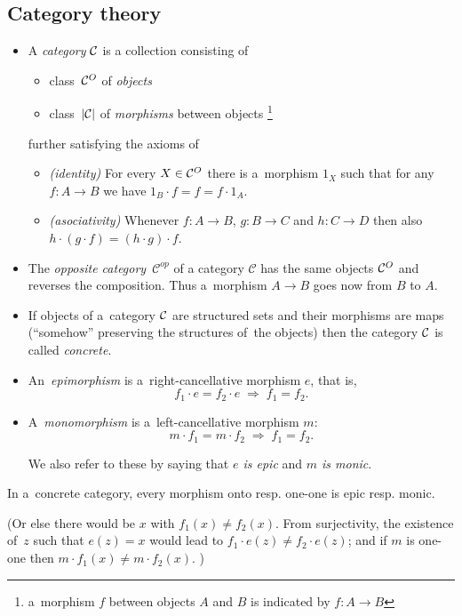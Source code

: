 \subsection*{Category theory}

\begin{itemize}
\item A \emph{category} $\mathcal{C}$ is a collection consisting of
  \begin{itemize}
  \item class~$\mathcal{C}^O$ of \emph{objects\/}
  \item class~$|\mathcal{C}|$ of \emph{morphisms\/} between objects\thinspace%
  \footnote{a~morphism $f$ between objects $A$ and $B$ is indicated by $f\colon
    A \to B$}
  \end{itemize}
further satisfying the axioms of
  \begin{itemize}
  \item \emph{(identity)\/}
  For every $X\in \mathcal{C}^O$ there is a~morphism $1_X$ such that for any $f\colon
  A \to B$ we have $1_B \cdot f = f = f \cdot 1_A$.
  \item \emph{(asociativity)\/}
  Whenever $f\colon A \to B$, $g\colon B \to C$ and $h\colon C \to D$ then also $h
  \cdot (g \cdot f) = (h \cdot g) \cdot f$.
  \end{itemize}

\item The \emph{opposite category}~$\mathcal{C}^{op}$ of a category
$\mathcal{C}$ has the same objects $\mathcal{C}^O$ and reverses the composition.
Thus a~morphism $A \to B$ goes now from $B$ to $A$.

\item If objects of a~category $\mathcal{C}$ are structured sets and their morphisms
are maps (``somehow'' preserving the structures of~the objects) then the
category $\mathcal{C}$ is called \emph{concrete\/}.

\item An~\emph{epimorphism} is a~right-cancellative morphism $e$, that is,
\[
  f_1 \cdot e = f_2 \cdot e \; \Longrightarrow \; f_1 = f_2.
\]

\item A~\emph{monomorphism} is a~left-cancellative morphism $m$:
\[
  m \cdot f_1 = m \cdot f_2 \; \Longrightarrow \; f_1 = f_2.
\]

We also refer to these by saying that \emph{$e$ is epic\/} and \emph{$m$ is
monic\/}.
\end{itemize}

\begin{fact} \label{fct:onto->epic}
  In a~concrete category, every morphism onto resp. one-one is epic resp.
  monic.
\end{fact}
(Or else there would be $x$ with $f_1(x) \ne f_2(x)$.
 From surjectivity, the existence of~$z$ such that $e(z) = x$ would lead to
 $f_1 \cdot e(z) \ne f_2 \cdot e(z)$;
 and if $m$ is one-one then $m \cdot f_1(x) \ne m \cdot f_2(x)$.
 )

